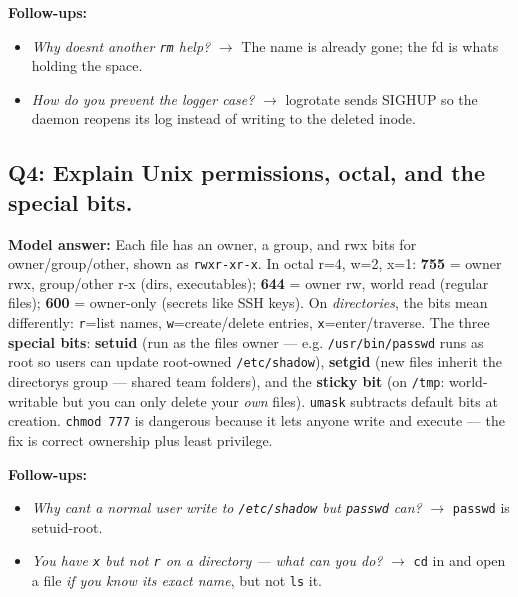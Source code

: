 \documentclass[11pt]{article}
\providecommand{\tightlist}{\setlength{\itemsep}{1pt}\setlength{\parskip}{0pt}}
\begin{document}
\textbf{Follow-ups:}

\begin{itemize}
\tightlist
\item
  \emph{Why doesn\textquotesingle t another \texttt{rm} help?} \(\rightarrow\) The name is already gone; the fd is what\textquotesingle s holding the space.
\item
  \emph{How do you prevent the logger case?} \(\rightarrow\) logrotate sends SIGHUP so the daemon reopens its log instead of writing to the deleted inode.
\end{itemize}

\subsection{Q4: Explain Unix permissions, octal, and the special bits.}\label{q4-explain-unix-permissions-octal-and-the-special-bits}

\textbf{Model answer:} Each file has an owner, a group, and rwx bits for owner/group/other, shown as \texttt{rwxr-xr-x}. In octal r=4, w=2, x=1: \textbf{755} = owner rwx, group/other r-x (dirs, executables); \textbf{644} = owner rw, world read (regular files); \textbf{600} = owner-only (secrets like SSH keys). On \emph{directories}, the bits mean differently: \texttt{r}=list names, \texttt{w}=create/delete entries, \texttt{x}=enter/traverse. The three \textbf{special bits}: \textbf{setuid} (run as the file\textquotesingle s owner --- e.g. \texttt{/usr/bin/passwd} runs as root so users can update root-owned \texttt{/etc/shadow}), \textbf{setgid} (new files inherit the directory\textquotesingle s group --- shared team folders), and the \textbf{sticky bit} (on \texttt{/tmp}: world-writable but you can only delete your \emph{own} files). \texttt{umask} subtracts default bits at creation. \texttt{chmod\ 777} is dangerous because it lets anyone write and execute --- the fix is correct ownership plus least privilege.

\textbf{Follow-ups:}

\begin{itemize}
\tightlist
\item
  \emph{Why can\textquotesingle t a normal user write to \texttt{/etc/shadow} but \texttt{passwd} can?} \(\rightarrow\) \texttt{passwd} is setuid-root.
\item
  \emph{You have \texttt{x} but not \texttt{r} on a directory --- what can you do?} \(\rightarrow\) \texttt{cd} in and open a file \emph{if you know its exact name}, but not \texttt{ls} it.
\end{itemize}
\end{document}
